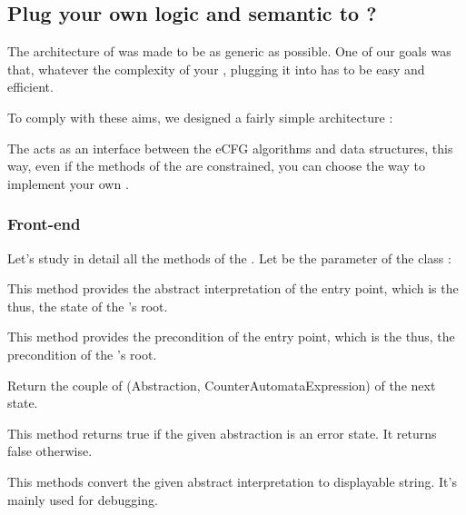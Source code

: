 \subsection{ Plug your own logic and semantic to \flatac ?}
The architecture of \flatac was made to be as generic as possible. One of our goals was that, whatever the complexity of your , plugging it into \flatac has to be easy and efficient.

\newpar To comply with these aims, we designed a fairly simple architecture :\\

\begin{center}\end{center}

The  acts as an interface between the \gls{eCFG} algorithms and data structures, this way, even if the methods of the  are constrained, you can choose the way to implement your own .

\subsubsection{Front-end}
Let's study in detail all the methods of the . Let  be the parameter of the  class :

This method provides the abstract interpretation of the entry point, which is the thus, the state of the 's root.

This method provides the precondition of the entry point, which is the thus, the precondition of the 's root.

Return the couple of (Abstraction, CounterAutomataExpression) of the next state.

This method returns true if the given abstraction is an error state. It returns false otherwise.

This methods convert the given abstract interpretation to displayable string. It's mainly used for debugging.


